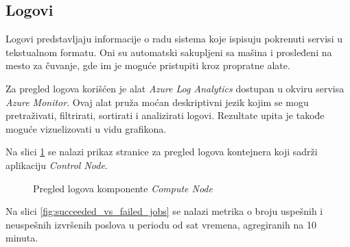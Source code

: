 \documentclass[12pt,oneside]{memoir}
\begin{document}
\subsection{Logovi}

Logovi predstavljaju informacije o radu sistema koje ispisuju pokrenuti servisi u tekstualnom formatu. Oni su automatski sakupljeni sa mašina i prosleđeni na mesto za čuvanje, gde im je moguće pristupiti kroz propratne alate.

Za pregled logova korišćen je alat \emph{Azure Log Analytics} dostupan u okviru servisa \emph{Azure Monitor}. Ovaj alat pruža moćan deskriptivni jezik kojim se mogu pretraživati, filtrirati, sortirati i analizirati logovi. Rezultate upita je takođe moguće vizuelizovati u vidu grafikona.

Na slici \ref{fig:computenodelogs} se nalazi prikaz stranice za pregled logova kontejnera koji sadrži aplikaciju \emph{Control Node}.

\begin{figure}[!ht]
  \centering
  \caption{Pregled logova komponente \emph{Compute Node}}
  \label{fig:computenodelogs}
\end{figure}

Na slici \ref{fig:succeeded_vs_failed_jobs} se nalazi metrika o broju uspešnih i neuspešnih izvršenih poslova u periodu od sat vremena, agregiranih na 10 minuta.
\end{document}
